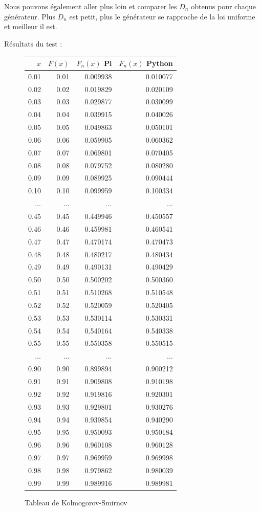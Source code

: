 \documentclass[10pt,a4paper]{article}
\begin{document}
	Nous pouvons également aller plus loin et comparer les $D_n$ obtenus pour chaque générateur. Plus $D_n$ est petit, plus le générateur se rapproche de la loi uniforme et meilleur il est.
	
	\newpage
	Résultats du test :
	\begin{figure}[h]
		\centering
		\begin{tabular}{|r|r|r|r|}
			\hline
			$x$ & $F(x)$ & $F_n(x)$ Pi & $F_n(x)$ Python\\
			\hline
			0.01 & 0.01 & 0.009938 & 0.010077\\
			0.02 & 0.02 & 0.019829 & 0.020109\\
			0.03 & 0.03 & 0.029877 & 0.030099\\
			0.04 & 0.04 & 0.039915 & 0.040026\\
			0.05 & 0.05 & 0.049863 & 0.050101\\
			0.06 & 0.06 & 0.059905 & 0.060362\\
			0.07 & 0.07 & 0.069801 & 0.070405\\
			0.08 & 0.08 & 0.079752 & 0.080280\\
			0.09 & 0.09 & 0.089925 & 0.090444\\
			0.10 & 0.10 & 0.099959 & 0.100334\\
			... & ... & ... & ...\\
			0.45 & 0.45 & 0.449946 & 0.450557\\
			0.46 & 0.46 & 0.459981 & 0.460541\\
			0.47 & 0.47 & 0.470174 & 0.470473\\
			0.48 & 0.48 & 0.480217 & 0.480434\\
			0.49 & 0.49 & 0.490131 & 0.490429\\
			0.50 & 0.50 & 0.500202 & 0.500360\\
			0.51 & 0.51 & 0.510268 & 0.510548\\
			0.52 & 0.52 & 0.520059 & 0.520405\\
			0.53 & 0.53 & 0.530114 & 0.530331\\
			0.54 & 0.54 & 0.540164 & 0.540338\\
			0.55 & 0.55 & 0.550358 & 0.550515\\
			... & ... & ... & ...\\
			0.90 & 0.90 & 0.899894 & 0.900212\\
			0.91 & 0.91 & 0.909808 & 0.910198\\
			0.92 & 0.92 & 0.919816 & 0.920301\\
			0.93 & 0.93 & 0.929801 & 0.930276\\
			0.94 & 0.94 & 0.939854 & 0.940290\\
			0.95 & 0.95 & 0.950093 & 0.950184\\
			0.96 & 0.96 & 0.960108 & 0.960128\\
			0.97 & 0.97 & 0.969959 & 0.969998\\
			0.98 & 0.98 & 0.979862 & 0.980039\\
			0.99 & 0.99 & 0.989916 & 0.989981\\
			\hline
		\end{tabular}
		\caption{Tableau de Kolmogorov-Smirnov}
	\end{figure}
	
\end{document}
